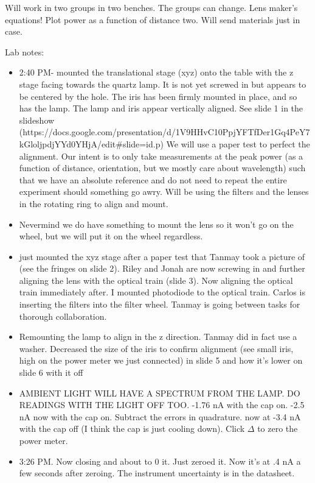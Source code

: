 \documentclass[11pt]{article}
\begin{document}
Will work in two groups in two benches. The groups can change. Lens
maker's equations! Plot power as a function of distance two. Will send
materials just in case.

    Lab notes:

\begin{itemize}
\item 2:40 PM- mounted the translational stage (xyz) onto the table with the z stage facing towards the quartz lamp. It is not yet screwed in but appears to be centered by the hole. The iris has been firmly mounted in place, and so has the lamp. The lamp and iris appear vertically aligned. See slide 1 in the slideshow (https://docs.google.com/presentation/d/1V9HHvC10PpjYFTfDer1Gq4PeY7kGloljpdjYYd0YHjA/edit#slide=id.p) We will use a paper test to perfect the alignment. Our intent is to only take measurements at the peak power (as a function of distance, orientation, but we mostly care about wavelength) such that we have an absolute reference and do not need to repeat the entire experiment should something go awry. Will be using the filters and the lenses in the rotating ring to align and mount. 
\item Nevermind we do have something to mount the lens so it won't go on the wheel, but we will put it on the wheel regardless. 
\item just mounted the xyz stage after a paper test that Tanmay took a picture of (see the fringes on slide 2). Riley and Jonah are now screwing in and further aligning the lens with the optical train (slide 3). Now aligning the optical train immediately after. I mounted photodiode to the optical train.
Carlos is inserting the filters into the filter wheel. Tanmay is going between tasks for thorough collaboration. 
\item Remounting the lamp to align in the z direction. Tanmay did in fact use a washer. Decreased the size of the iris to confirm alignment (see small iris, high on the power meter we just connected) in slide 5 and how it's lower on slide 6 with it off
\item AMBIENT LIGHT WILL HAVE A SPECTRUM FROM THE LAMP. DO READINGS WITH THE LIGHT OFF TOO. -1.76 nA with the cap on. -2.5 nA now with the cap on. Subtract the errors in quadrature. now at -3.4 nA with the cap off (I think the cap is just cooling down). Click $\Delta$ to zero the power meter. 
\item 3:26 PM. Now closing and about to 0 it. Just zeroed it. Now it's at .4 nA a few seconds after zeroing. The instrument uncertainty is in the datasheet. 

\end{itemize}
\end{document}
